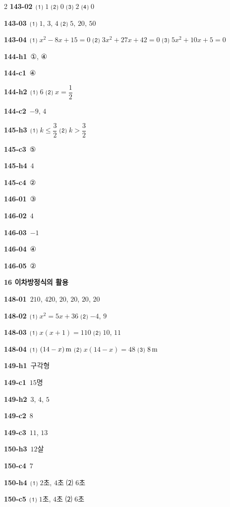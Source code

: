 \documentclass[10pt,a4paper]{article}
\begin{document}
\begin{multicols}{2}
\noindent\textbf{143-02}\ ⑴ $1$ ⑵ $0$ ⑶ $2$ ⑷ $0$\par
\noindent\textbf{143-03}\ ⑴ $1$, $3$, $4$ ⑵ $5$, $20$, $50$\par
\noindent\textbf{143-04}\ ⑴ $x^2-8x+15=0$ ⑵ $3x^2+27x+42=0$ ⑶ $5x^2+10x+5=0$\par
\noindent\textbf{144-h1}\ ①, ④\par
\noindent\textbf{144-c1}\ ④\par
\noindent\textbf{144-h2}\ ⑴ $6$ ⑵ $x=\dfrac{1}{2}$\par
\noindent\textbf{144-c2}\ $-9$, $4$\par
\noindent\textbf{145-h3}\ ⑴ $k\le\dfrac{3}{2}$ ⑵ $k>\dfrac{3}{2}$\par
\noindent\textbf{145-c3}\ ⑤\par
\noindent\textbf{145-h4}\ $4$\par
\noindent\textbf{145-c4}\ ②\par
\noindent\textbf{146-01}\ ③\par
\noindent\textbf{146-02}\ $4$\par
\noindent\textbf{146-03}\ $-1$\par
\noindent\textbf{146-04}\ ④\par
\noindent\textbf{146-05}\ ②\par
\noindent\textbf{16 이차방정식의 활용}\par\smallskip
\noindent\textbf{148-01}\ $210$, $420$, $20$, $20$, $20$, $20$\par
\noindent\textbf{148-02}\ ⑴ $x^2=5x+36$ ⑵ $-4$, $9$\par
\noindent\textbf{148-03}\ ⑴ $x(x+1)=110$ ⑵ $10$, $11$\par
\noindent\textbf{148-04}\ ⑴ $(14-x)\mkern3mu \mathrm{m}$ ⑵ $x(14-x)=48$ ⑶ $8\mkern3mu \mathrm{m}$\par
\noindent\textbf{149-h1}\ 구각형\par
\noindent\textbf{149-c1}\ $15$명\par
\noindent\textbf{149-h2}\ $3$, $4$, $5$\par
\noindent\textbf{149-c2}\ $8$\par
\noindent\textbf{149-c3}\ $11$, $13$\par
\noindent\textbf{150-h3}\ $12$살\par
\noindent\textbf{150-c4}\ $7$\par
\noindent\textbf{150-h4}\ ⑴ $2$초, $4$초 ⑵ $6$초\par
\noindent\textbf{150-c5}\ ⑴ $1$초, $4$초 ⑵ $6$초\par

\end{multicols}
\end{document}
